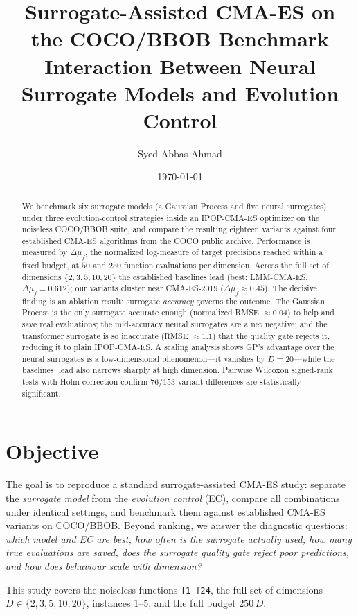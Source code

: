 \documentclass[11pt,a4paper]{article}
\title{\textbf{Surrogate-Assisted CMA-ES on the COCO/BBOB Benchmark}\\[2pt]
\large Interaction Between Neural Surrogate Models and Evolution Control}
\author{Syed Abbas Ahmad}
\date{\today}
\newcommand{\dmf}{\Delta\mu_f}
\begin{document}
\maketitle

\begin{abstract}
\noindent
We benchmark six surrogate models (a Gaussian Process and five neural surrogates) under
three evolution-control strategies inside an IPOP-CMA-ES optimizer on the noiseless COCO/BBOB
suite, and compare the resulting eighteen variants against four established CMA-ES algorithms
from the COCO public archive. Performance is measured by $\dmf$, the normalized log-measure of
target precisions reached within a fixed budget, at $50$ and $250$ function evaluations per
dimension. Across the full set of dimensions $\{2,3,5,10,20\}$ the established baselines lead
(best: LMM-CMA-ES, $\dmf=0.612$); our variants cluster near CMA-ES-2019 ($\dmf\approx0.45$). The
decisive finding is an ablation result: surrogate \emph{accuracy} governs the outcome. The
Gaussian Process is the only surrogate accurate enough (normalized RMSE $\approx0.04$) to help
and save real evaluations; the mid-accuracy neural surrogates are a net negative; and the
transformer surrogate is so inaccurate (RMSE $\approx1.1$) that the quality gate rejects it,
reducing it to plain IPOP-CMA-ES. A scaling analysis shows GP's advantage over the neural
surrogates is a low-dimensional phenomenon---it vanishes by $D=20$---while the baselines'
lead also narrows sharply at high dimension. Pairwise Wilcoxon signed-rank tests with Holm
correction confirm $76/153$ variant differences are statistically significant.
\end{abstract}

\section{Objective}
The goal is to reproduce a standard surrogate-assisted CMA-ES study: separate the
\emph{surrogate model} from the \emph{evolution control} (EC), compare all combinations under
identical settings, and benchmark them against established CMA-ES variants on COCO/BBOB. Beyond
ranking, we answer the diagnostic questions: \emph{which model and EC are best, how often is the
surrogate actually used, how many true evaluations are saved, does the surrogate quality gate
reject poor predictions, and how does behaviour scale with dimension?}

This study covers the noiseless functions \texttt{f1--f24}, the full set of dimensions
$D\in\{2,3,5,10,20\}$, instances $1$--$5$, and the full budget $250\,D$.
\end{document}

